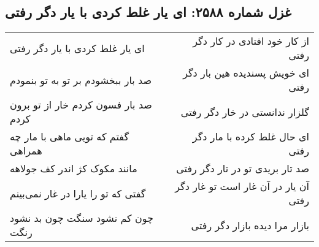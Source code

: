 \begin{center}
\section*{غزل شماره ۲۵۸۸: ای یار غلط کردی با یار دگر رفتی}
\label{sec:2588}
\begin{longtable}{l p{0.5cm} r}
ای یار غلط کردی با یار دگر رفتی
&&
از کار خود افتادی در کار دگر رفتی
\\
صد بار ببخشودم بر تو به تو بنمودم
&&
ای خویش پسندیده هین بار دگر رفتی
\\
صد بار فسون کردم خار از تو برون کردم
&&
گلزار ندانستی در خار دگر رفتی
\\
گفتم که تویی ماهی با مار چه همراهی
&&
ای حال غلط کرده با مار دگر رفتی
\\
مانند مکوک کژ اندر کف جولاهه
&&
صد تار بریدی تو در تار دگر رفتی
\\
گفتی که تو را یارا در غار نمی‌بینم
&&
آن یار در آن غار است تو غار دگر رفتی
\\
چون کم نشود سنگت چون بد نشود رنگت
&&
بازار مرا دیده بازار دگر رفتی
\\
\end{longtable}
\end{center}
